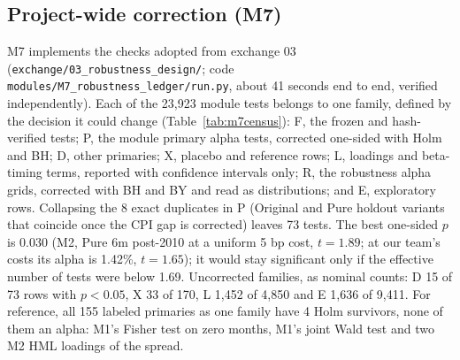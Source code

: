\subsection{Project-wide correction (M7)}
\label{app:m7}
M7 implements the checks adopted from exchange 03 (\texttt{exchange/03\_robustness\_design/}; code \texttt{modules/M7\_robustness\_ledger/run.py}, about 41 seconds end to end, verified independently). Each of the 23,923 module tests belongs to one family, defined by the decision it could change (Table~\ref{tab:m7census}): F, the frozen and hash-verified tests; P, the module primary alpha tests, corrected one-sided with Holm and BH; D, other primaries; X, placebo and reference rows; L, loadings and beta-timing terms, reported with confidence intervals only; R, the robustness alpha grids, corrected with BH and BY and read as distributions; and E, exploratory rows. Collapsing the 8 exact duplicates in P (Original and Pure holdout variants that coincide once the CPI gap is corrected) leaves 73 tests. The best one-sided $p$ is 0.030 (M2, Pure 6m post-2010 at a uniform 5 bp cost, $t=1.89$; at our team's costs its alpha is 1.42\%, $t=1.65$); it would stay significant only if the effective number of tests were below 1.69. Uncorrected families, as nominal counts: D 15 of 73 rows with $p<0.05$, X 33 of 170, L 1,452 of 4,850 and E 1,636 of 9,411. For reference, all 155 labeled primaries as one family have 4 Holm survivors, none of them an alpha: M1's Fisher test on zero months, M1's joint Wald test and two M2 HML loadings of the spread.

